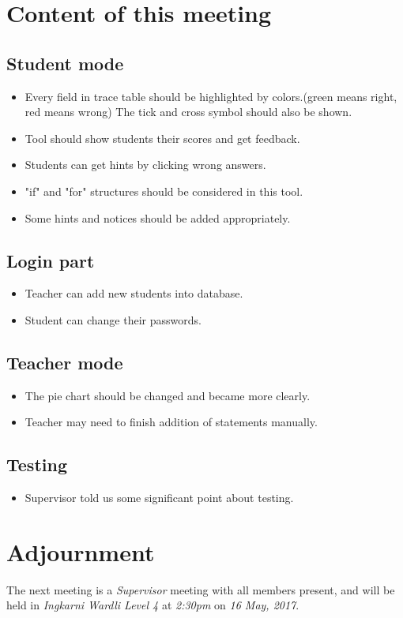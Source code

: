 \documentclass[11pt, a4paper]{article}
\begin{document}
\section{Content of this meeting}
\subsection{Student mode}
\begin{itemize}
\item Every field in trace table should be highlighted by colors.(green means right, red means wrong) The tick and cross symbol should also be shown.
\item Tool should show students their scores and get feedback.
\item Students can get hints by clicking wrong answers.
\item "if" and "for" structures should be considered in this tool.
\item Some hints and notices should be added appropriately.

\end{itemize}

\subsection{Login part}
\begin{itemize}
\item Teacher can add new students into database.
\item Student can change their passwords.
\end{itemize}

\subsection{Teacher mode}
\begin{itemize}
\item The pie chart should be changed and became more clearly.
\item Teacher may need to finish addition of statements manually.
\end{itemize}

\subsection{Testing}
\begin{itemize}
\item Supervisor told us some significant point about testing.
\end{itemize}


\section{Adjournment}
The next meeting is a \emph{Supervisor} meeting with all members present, and will be held in \emph{Ingkarni Wardli Level 4} at \emph{2:30pm} on \emph{16 May, 2017}.
\end{document}

